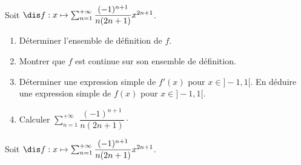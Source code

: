\documentclass[a4paper,10pt]{report}
\begin{document}
  
  \begin{Exercice}{} Soit $\dis f : x \mapsto \sum_{n=1}^{+ \infty} \dfrac{(-1)^{n+1}}{n(2n+1)} x^{2n+1}$.

\begin{enumerate}
\item Déterminer l'ensemble de définition de $f$.
\item Montrer que $f$ est continue sur son ensemble de définition.
\item Déterminer une expression simple de $f'(x)$ pour $x \in ]-1,1[$. En déduire une expression simple de $f(x)$ pour $x \in ]-1,1[$.
\item Calculer $ \sum_{n=1}^{+ \infty} \dfrac{(-1)^{n+1}}{n(2n+1)} \cdot$
\end{enumerate}
\end{Exercice}


\corr  Soit $\dis f : x \mapsto \sum_{n=1}^{+ \infty} \dfrac{(-1)^{n+1}}{n(2n+1)} x^{2n+1}$.
\end{document}
